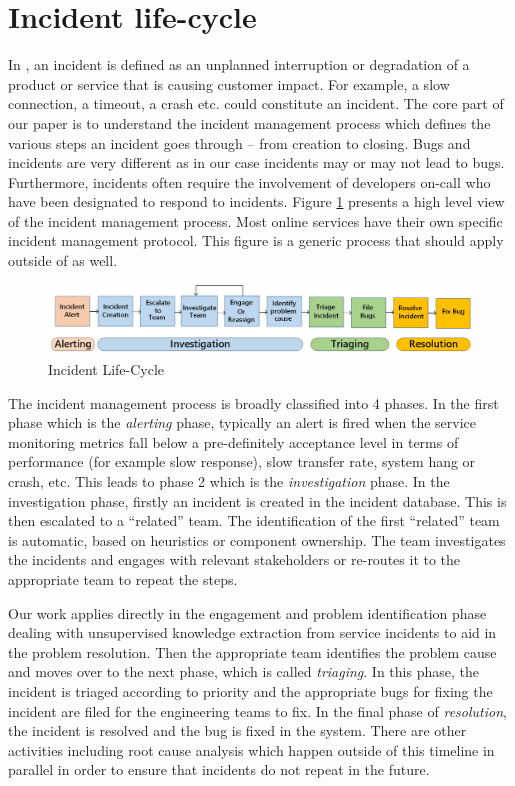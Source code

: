 \section{Incident life-cycle}
\label{incident-life-cycle}

In \CompanyX{}, an incident is defined as an unplanned interruption or degradation of a product or service that is causing customer impact. For example, a slow connection, a timeout, a crash etc. could constitute an incident. The core part of our paper is to understand the incident management process which defines the various steps an incident goes through – from creation to closing. Bugs and incidents are very different as in our case incidents may or may not lead to bugs. Furthermore, incidents often require the involvement of developers on-call who have been designated to respond to incidents. Figure \ref{fig:incident-lifecycle} presents a high level view of the incident management process. Most online services have their own specific incident management protocol. This figure is a generic process that should apply outside of \CompanyX{} as well.

\begin{figure}[H]
\vspace{-6pt}
\includegraphics[width=\linewidth]{Figures/Incident_Lifecycle.jpg}
\caption{Incident Life-Cycle}
\label{fig:incident-lifecycle}
\vspace{-6pt}
\end{figure}
The incident management process is broadly classified into 4 phases. In the first phase which is the \emph{alerting} phase, typically an alert is fired when the service monitoring metrics fall below a pre-definitely acceptance level in terms of performance (for example slow response), slow transfer rate, system hang or crash, etc. This leads to phase 2 which is the \emph{investigation} phase. In the investigation phase, firstly an incident is created in the incident database. This is then escalated to a “related” team. The identification of the first “related” team is automatic, based on heuristics or component ownership. The team investigates the incidents and engages with relevant stakeholders or re-routes it to the appropriate team to repeat the steps. 
    
Our work applies directly in the engagement and problem identification phase dealing with unsupervised knowledge extraction from service incidents to aid in the problem resolution. Then the appropriate team identifies the problem cause and moves over to the next phase, which is called \emph{triaging}. In this phase, the incident is triaged according to priority and the appropriate bugs for fixing the incident are filed for the engineering teams to fix. In the final phase of \emph{resolution}, the incident is resolved and the bug is fixed in the system. There are other activities including root cause analysis which happen outside of this timeline in parallel in order to ensure that incidents do not repeat in the future.